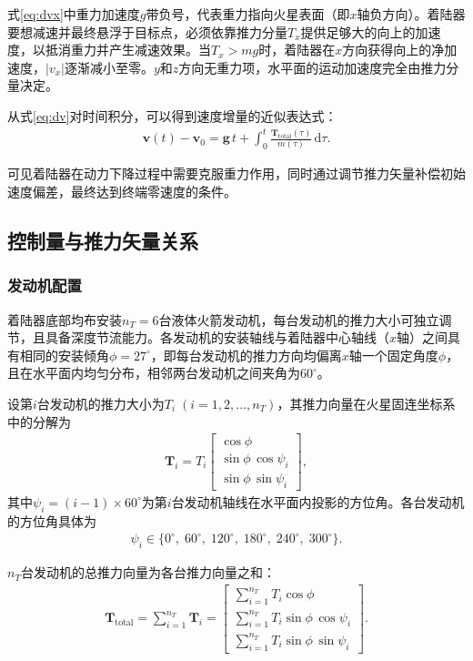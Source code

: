 式\eqref{eq:dvx}中重力加速度$g$带负号，代表重力指向火星表面（即$x$轴负方向）。着陆器要想减速并最终悬浮于目标点，必须依靠推力分量$T_x$提供足够大的向上的加速度，以抵消重力并产生减速效果。当$T_x > mg$时，着陆器在$x$方向获得向上的净加速度，$|v_x|$逐渐减小至零。$y$和$z$方向无重力项，水平面的运动加速度完全由推力分量决定。

从式\eqref{eq:dv}对时间积分，可以得到速度增量的近似表达式：
\begin{align}
    \bm{v}(t) - \bm{v}_0 = \bm{g}\,t + \int_0^{t} \frac{\bm{T}_{\mathrm{total}}(\tau)}{m(\tau)}\,\mathrm{d}\tau.
\end{align}

可见着陆器在动力下降过程中需要克服重力作用，同时通过调节推力矢量补偿初始速度偏差，最终达到终端零速度的条件。

\subsection{控制量与推力矢量关系}

\subsubsection{发动机配置}

着陆器底部均布安装$n_T = 6$台液体火箭发动机，每台发动机的推力大小可独立调节，且具备深度节流能力。各发动机的安装轴线与着陆器中心轴线（$x$轴）之间具有相同的安装倾角$\phi = 27^\circ$，即每台发动机的推力方向均偏离$x$轴一个固定角度$\phi$，且在水平面内均匀分布，相邻两台发动机之间夹角为$60^\circ$。

设第$i$台发动机的推力大小为$T_i\;(i = 1, 2, \ldots, n_T)$，其推力向量在火星固连坐标系中的分解为
\begin{align}
    \bm{T}_i = T_i
    \begin{bmatrix}
        \cos\phi \\
        \sin\phi\,\cos\psi_i \\
        \sin\phi\,\sin\psi_i
    \end{bmatrix},
\end{align}
其中$\psi_i = (i-1)\times 60^\circ$为第$i$台发动机轴线在水平面内投影的方位角。各台发动机的方位角具体为
\begin{align}
    \psi_i \in \{0^\circ,\; 60^\circ,\; 120^\circ,\; 180^\circ,\; 240^\circ,\; 300^\circ\}.
\end{align}

$n_T$台发动机的总推力向量为各台推力向量之和：
\begin{align}
    \bm{T}_{\mathrm{total}} = \sum_{i=1}^{n_T} \bm{T}_i =
    \begin{bmatrix}
        \displaystyle\sum_{i=1}^{n_T} T_i\cos\phi \\[6pt]
        \displaystyle\sum_{i=1}^{n_T} T_i\sin\phi\,\cos\psi_i \\[6pt]
        \displaystyle\sum_{i=1}^{n_T} T_i\sin\phi\,\sin\psi_i
    \end{bmatrix}. \label{eq:Ttotal}
\end{align}

